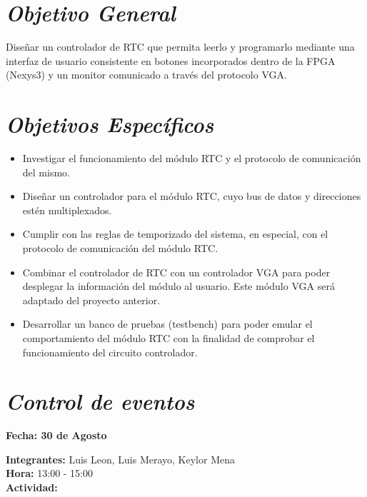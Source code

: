 \documentclass[12pt,a4paper]{report}
\begin{document}
\section*{\textit{Objetivo General}}
Diseñar un controlador de RTC que permita leerlo y programarlo mediante una interfaz de usuario consistente en botones incorporados dentro de la FPGA (Nexys3) y un monitor comunicado a través del protocolo VGA.

\section*{\textit{Objetivos Específicos}}
\begin{itemize}
\item Investigar el funcionamiento del módulo RTC y el protocolo de comunicación del mismo.
\item Diseñar un controlador para el módulo RTC, cuyo bus de datos y direcciones estén multiplexados.
\item Cumplir con las reglas de temporizado del sistema, en especial, con el protocolo de comunicación del módulo RTC.
\item Combinar el controlador de RTC con un controlador VGA para poder desplegar la información del módulo al usuario. Este módulo VGA será adaptado del proyecto anterior.
\item Desarrollar un banco de pruebas (testbench) para poder emular el comportamiento del módulo RTC con la finalidad de comprobar el funcionamiento del circuito controlador.
\end{itemize}

\newpage

\section*{\textit{Control de eventos}}

\begin{flushright}
	\begin{large}
		\textbf{Fecha: 30 de Agosto}\\[5ex]
	\end{large}
\end{flushright}

\noindent \textbf{Integrantes:} Luis Leon, Luis Merayo, Keylor Mena \\[1ex]
\textbf{Hora:} 13:00 - 15:00 \\[1ex]
\textbf{Actividad:} \\[2ex]
\end{document}
